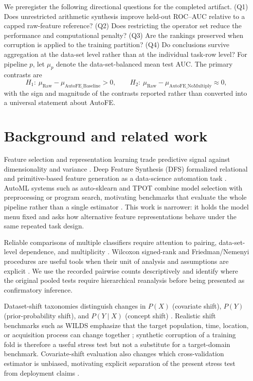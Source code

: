 \documentclass[preprint,12pt]{elsarticle}
\begin{document}
We preregister the following directional questions for the completed artifact.  (Q1) Does unrestricted arithmetic synthesis improve held-out ROC--AUC relative to a capped raw-feature reference?  (Q2) Does restricting the operator set reduce the performance and computational penalty?  (Q3) Are the rankings preserved when corruption is applied to the training partition?  (Q4) Do conclusions survive aggregation at the data-set level rather than at the individual task-row level?  For pipeline $p$, let $\mu_p$ denote the data-set-balanced mean test AUC.  The primary contrasts are
\begin{equation}
  H_{1}:\ \mu_{\mathrm{Raw}}-\mu_{\mathrm{AutoFE\_Baseline}}>0,
  \qquad
  H_{2}:\ \mu_{\mathrm{Raw}}-\mu_{\mathrm{AutoFE\_NoMultiply}}\approx 0,
\end{equation}
with the sign and magnitude of the contrasts reported rather than converted into a universal statement about AutoFE.

\section{Background and related work}
\label{sec:related}

Feature selection and representation learning trade predictive signal against dimensionality and variance \citep{guyon2003}.  Deep Feature Synthesis (DFS) formalized relational and primitive-based feature generation as a data-science automation task \citep{kanter2015}.  AutoML systems such as auto-sklearn and TPOT combine model selection with preprocessing or program search, motivating benchmarks that evaluate the whole pipeline rather than a single estimator \citep{feurer2015,olson2019}.  This work is narrower: it holds the model menu fixed and asks how alternative feature representations behave under the same repeated task design.

Reliable comparisons of multiple classifiers require attention to pairing, data-set-level dependence, and multiplicity \citep{demsar2006}.  Wilcoxon signed-rank and Friedman/Nemenyi procedures are useful tools when their unit of analysis and assumptions are explicit \citep{wilcoxon1945,friedman1937,nemenyi1963}.  We use the recorded pairwise counts descriptively and identify where the original pooled tests require hierarchical reanalysis before being presented as confirmatory inference.

Dataset-shift taxonomies distinguish changes in $P(X)$ (covariate shift), $P(Y)$ (prior-probability shift), and $P(Y\mid X)$ (concept shift) \citep{moreno2012}.  Realistic shift benchmarks such as WILDS emphasize that the target population, time, location, or acquisition process can change together \citep{koh2021}; synthetic corruption of a training fold is therefore a useful stress test but not a substitute for a target-domain benchmark.  Covariate-shift evaluation also changes which cross-validation estimator is unbiased, motivating explicit separation of the present stress test from deployment claims \citep{sugiyama2007}.
\end{document}
